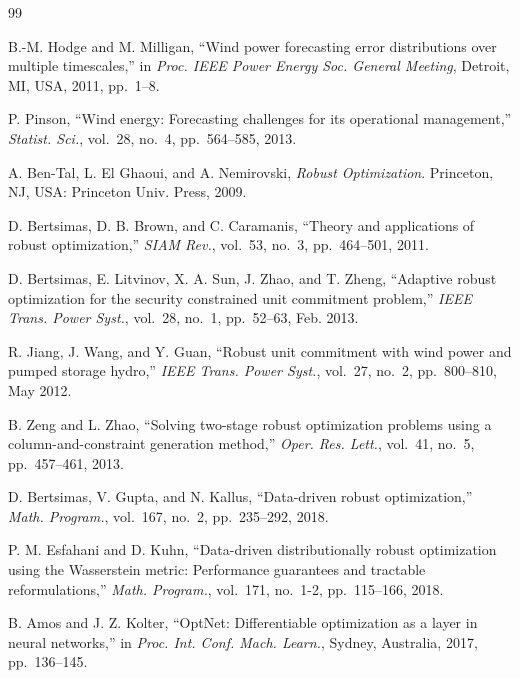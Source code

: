 \documentclass[lettersize,journal]{IEEEtran}
\theoremstyle{definition}
\begin{document}
\begin{thebibliography}{99}

B.-M. Hodge and M. Milligan, ``Wind power forecasting error distributions over multiple timescales,'' in \emph{Proc. IEEE Power Energy Soc. General Meeting}, Detroit, MI, USA, 2011, pp.~1--8.

P. Pinson, ``Wind energy: Forecasting challenges for its operational management,'' \emph{Statist. Sci.}, vol.~28, no.~4, pp.~564--585, 2013.

A. Ben-Tal, L. El Ghaoui, and A. Nemirovski, \emph{Robust Optimization}. Princeton, NJ, USA: Princeton Univ. Press, 2009.

D. Bertsimas, D. B. Brown, and C. Caramanis, ``Theory and applications of robust optimization,'' \emph{SIAM Rev.}, vol.~53, no.~3, pp.~464--501, 2011.

D. Bertsimas, E. Litvinov, X. A. Sun, J. Zhao, and T. Zheng, ``Adaptive robust optimization for the security constrained unit commitment problem,'' \emph{IEEE Trans. Power Syst.}, vol.~28, no.~1, pp.~52--63, Feb. 2013.

R. Jiang, J. Wang, and Y. Guan, ``Robust unit commitment with wind power and pumped storage hydro,'' \emph{IEEE Trans. Power Syst.}, vol.~27, no.~2, pp.~800--810, May 2012.

B. Zeng and L. Zhao, ``Solving two-stage robust optimization problems using a column-and-constraint generation method,'' \emph{Oper. Res. Lett.}, vol.~41, no.~5, pp.~457--461, 2013.

D. Bertsimas, V. Gupta, and N. Kallus, ``Data-driven robust optimization,'' \emph{Math. Program.}, vol.~167, no.~2, pp.~235--292, 2018.

P. M. Esfahani and D. Kuhn, ``Data-driven distributionally robust optimization using the Wasserstein metric: Performance guarantees and tractable reformulations,'' \emph{Math. Program.}, vol.~171, no.~1-2, pp.~115--166, 2018.

B. Amos and J. Z. Kolter, ``OptNet: Differentiable optimization as a layer in neural networks,'' in \emph{Proc. Int. Conf. Mach. Learn.}, Sydney, Australia, 2017, pp.~136--145.


\end{thebibliography}
\end{document}
